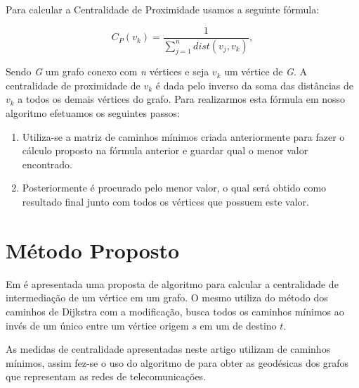 \documentclass[12pt]{article}
\begin{document}
Para calcular a Centralidade de Proximidade usamos a seguinte fórmula:
\begin{center}
\begin{equation}
C_P(v_k)=\frac{1}{\sum\limits_{j = 1}^n dist(v_j,v_k)},
\end{equation}
\end{center}
Sendo {\it G} um grafo conexo com {\it n} vértices e seja $v_k$ um vértice de {\it G}. A centralidade de proximidade de $v_k$ é dada pelo inverso da soma das distâncias de $v_k$ a todos os demais vértices do grafo.
Para realizarmos esta fórmula em nosso algoritmo efetuamos os seguintes passos:
\begin{enumerate}
\item Utiliza-se a matriz de caminhos mínimos criada anteriormente para fazer o cálculo proposto na fórmula anterior e guardar qual o menor valor encontrado.
\item Posteriormente é procurado pelo menor valor, o qual será obtido como resultado final junto com todos os vértices que possuem este valor.
\end{enumerate}

\section{Método Proposto}\label{sec:met}

Em \cite{Brandes01afaster} é apresentada uma proposta de algoritmo para calcular a centralidade de intermediação de um vértice em um grafo. O mesmo utiliza do método dos caminhos de Dijkstra com a modificação, busca todos os caminhos mínimos ao invés de um único entre um vértice origem $s$ em um de destino $t$.

As medidas de centralidade apresentadas neste artigo utilizam de caminhos mínimos, assim fez-se o uso do algoritmo de \cite{Brandes01afaster} para obter as geodésicas dos grafos que representam as redes de telecomunicações.
\end{document}

